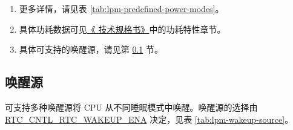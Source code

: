 \documentclass[main\_\_CN.tex]{subfiles}
\begin{document}
\begin{tiplisting}
\vspace{-2em}
\label{other:lpm-predefined-modes-notes}
\begin{enumerate}
    \item 更多详情，请见表 \ref{tab:lpm-predefined-power-modes}。
    \item 具体功耗数据可见\href{https://www.espressif.com/sites/default/files/documentation/esp32-s3_datasheet_cn.pdf}{《\chipname{} 技术规格书》}中的功耗特性章节。
    \item 具体可支持的唤醒源，请见第 \ref{sec:lpm-wakeup-source} 节。
\end{enumerate}
\end{tiplisting}


\subsection{唤醒源}\label{sec:lpm-wakeup-source}

\chipname{} 可支持多种唤醒源将 CPU 从不同睡眠模式中唤醒。唤醒源的选择由 \hyperref[fielddesc:RTCCNTLRTCWAKEUPENA]{RTC\_CNTL\_RTC\_WAKEUP\_ENA} 决定，见表 \ref{tab:lpm-wakeup-source}。
\end{document}
